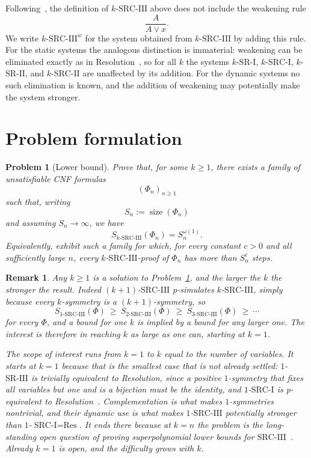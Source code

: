 \documentclass[10pt]{article}
\newtheorem{problem}{Problem}
\newtheorem{remark}[theorem]{Remark}
\newcommand{\SRI}{\text{SR-I}}
\newcommand{\SRII}{\text{SR-II}}
\newcommand{\SRIII}{\text{SR-III}}
\newcommand{\SRCI}{\text{SRC-I}}
\newcommand{\SRCII}{\text{SRC-II}}
\newcommand{\SRCIII}{\text{SRC-III}}
\newcommand{\Res}{\text{Res}}
\begin{document}
Following~\cite{Gaevoy26}, the definition of $k$-$\SRCIII$ above does not
include the weakening rule
\[
\frac{A}{A\lor x}.
\]
We write $k$-$\SRCIII^{w}$ for the system obtained from $k$-$\SRCIII$ by
adding this rule. For the static systems the analogous distinction is
immaterial: weakening can be eliminated exactly as in
Resolution~\cite{Szeider05}, so for all $k$ the systems $k$-$\SRI$,
$k$-$\SRCI$, $k$-$\SRII$, and $k$-$\SRCII$ are unaffected by its addition. For
the dynamic systems no such elimination is known, and the addition of
weakening may potentially make the system stronger.

\section{Problem formulation}

\begin{problem}[Lower bound]\label{prob:lb}
Prove that, for some $k\ge 1$, there exists a family of unsatisfiable CNF
formulas
\[
(\Phi_n)_{n\ge 1}
\]
such that, writing
\[
S_n:=\operatorname{size}(\Phi_n)
\]
and assuming $S_n\to\infty$, we have
\[
S_{k\text{-}\SRCIII}(\Phi_n)=S_n^{\omega(1)}.
\]
Equivalently, exhibit such a family for which, for every constant $c>0$ and
all sufficiently large $n$, every $k$-$\SRCIII$-proof of $\Phi_n$ has more
than $S_n^{c}$ steps.
\end{problem}

\begin{remark}\label{rem:k}
Any $k\ge 1$ is a solution to Problem~\ref{prob:lb}, and the larger the $k$
the stronger the result. Indeed $(k+1)$-$\SRCIII$ p-simulates $k$-$\SRCIII$,
simply because every $k$-symmetry is a $(k+1)$-symmetry, so
\[
S_{1\text{-}\SRCIII}(\Phi)
\ \ge\
S_{2\text{-}\SRCIII}(\Phi)
\ \ge\
S_{3\text{-}\SRCIII}(\Phi)
\ \ge\ \cdots
\]
for every $\Phi$, and a bound for one $k$ is implied by a bound for any larger
one. The interest is therefore in reaching $k$ as large as one can, starting at
$k=1$.

The scope of interest runs from $k=1$ to $k$ equal to the number of variables.
It starts at $k=1$ because that is the smallest case that is not already
settled: $1$-$\SRIII$ is trivially equivalent to Resolution, since a positive
$1$-symmetry that fixes all variables but one and is a bijection must be the
identity, and $1$-$\SRCI$ is p-equivalent to Resolution~\cite{Gaevoy26}.
Complementation is what makes $1$-symmetries nontrivial, and their dynamic use
is what makes $1$-$\SRCIII$ potentially stronger than $1$-$\SRCI=\Res$. It
ends there because at $k=n$ the problem is the long-standing open question of
proving superpolynomial lower bounds for $\SRCIII$~\cite{Szeider05}. Already
$k=1$ is open, and the difficulty grows with $k$.
\end{remark}
\end{document}
